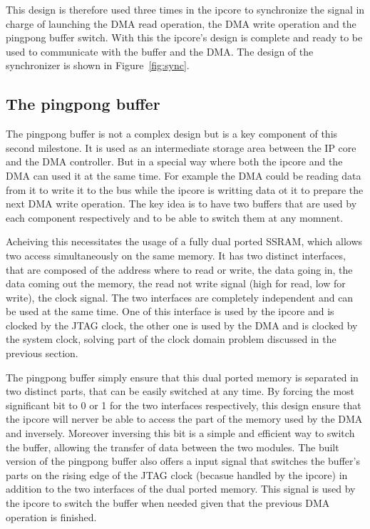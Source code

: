 \documentclass[a4paper,11pt,oneside]{report}
\begin{document}
This design is therefore used three times in the ipcore to synchronize the signal in charge of launching the DMA read operation, the DMA write operation and the pingpong buffer switch.
With this the ipcore's design is complete and ready to be used to communicate with the buffer and the DMA.
The design of the synchronizer is shown in Figure~\ref{fig:sync}.

\subsection{The pingpong buffer}

The pingpong buffer is not a complex design but is a key component of this second milestone.
It is used as an intermediate storage area between the IP core and the DMA controller. But in a special way where both
the ipcore and the DMA can used it at the same time. For example the DMA could be reading data from it to write it to the bus while the ipcore is writting data ot it to prepare the 
next DMA write operation. The key idea is to have two buffers that are used by each component respectively and to be able to switch them at any momnent.

Acheiving this necessitates the usage of a fully dual ported SSRAM, which allows two access simultaneously on the same memory. It has two distinct interfaces, that are 
composed of the address where to read or write, the data going in, the data coming out the memory, the read not write signal (high for read, low for write), the clock signal.
The two interfaces are completely independent and can be used at the same time. One of this interface is used by the ipcore and is clocked by the JTAG clock, 
the other one is used by the DMA and is clocked by the system clock, solving part of the clock domain problem discussed in the previous section.  

The pingpong buffer simply ensure that this dual ported memory is separated in two distinct parts, that can be easily switched at any time.
By forcing the most significant bit to 0 or 1 for the two interfaces respectively, this design ensure that the ipcore will nerver be able to access the part of the memory used by the DMA and inversely.  
Moreover inversing this bit is a simple and efficient way to switch the buffer, allowing the transfer of data between the two modules.
The built version of the pingpong buffer also offers a input signal that switches the buffer's parts on the rising edge of the JTAG clock (becasue handled by the ipcore) in addition to 
the two interfaces of the dual ported memory. This signal is used by the ipcore to switch the buffer when needed given that the previous DMA operation is finished.
\end{document}
